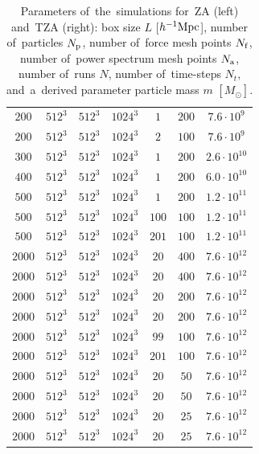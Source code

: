 \begin{landscape}
\begin{table}
{\begin{tabular}{ ccccccc }
    $200$ & $512^3$ & $512^3$ & $1024^3$ & $1$ & $200$ & $7.6\cdot10^{9}$\\
    $200$ & $512^3$ & $512^3$ & $1024^3$ & $2$ & $100$ & $7.6\cdot10^{9}$\\
    $300$ & $512^3$ & $512^3$ & $1024^3$ & $1$ & $200$ & $2.6\cdot10^{10}$\\
    $400$ & $512^3$ & $512^3$ & $1024^3$ & $1$ & $200$ & $6.0\cdot10^{10}$\\
    $500$ & $512^3$ & $512^3$ & $1024^3$ & $1$ & $200$ & $1.2\cdot10^{11}$\\
    $500$ & $512^3$ & $512^3$ & $1024^3$ & $100$ & $100$ & $1.2\cdot10^{11}$\\
    $500$ & $512^3$ & $512^3$ & $1024^3$ & $201$ & $100$ & $1.2\cdot10^{11}$\\
    $2000$ & $512^3$ & $512^3$ & $1024^3$ & $20$ & $400$ & $7.6\cdot10^{12}$\\
    $2000$ & $512^3$ & $512^3$ & $1024^3$ & $20$ & $400$ & $7.6\cdot10^{12}$\\
    $2000$ & $512^3$ & $512^3$ & $1024^3$ & $20$ & $200$ & $7.6\cdot10^{12}$\\
    $2000$ & $512^3$ & $512^3$ & $1024^3$ & $20$ & $200$ & $7.6\cdot10^{12}$\\
    $2000$ & $512^3$ & $512^3$ & $1024^3$ & $99$ & $100$ & $7.6\cdot10^{12}$\\
    $2000$ & $512^3$ & $512^3$ & $1024^3$ & $201$ & $100$ & $7.6\cdot10^{12}$\\
    $2000$ & $512^3$ & $512^3$ & $1024^3$ & $20$ & $50$ & $7.6\cdot10^{12}$\\
    $2000$ & $512^3$ & $512^3$ & $1024^3$ & $20$ & $50$ & $7.6\cdot10^{12}$\\
    $2000$ & $512^3$ & $512^3$ & $1024^3$ & $20$ & $25$ & $7.6\cdot10^{12}$\\
    $2000$ & $512^3$ & $512^3$ & $1024^3$ & $20$ & $25$ & $7.6\cdot10^{12}$\\
    \hline
    \end{tabular}
    }
    \caption{Parameters of~the~simulations for~ZA (left) and~TZA (right): box size $L$ [$h^{-1}\text{Mpc}$], number of~particles $N_{\rm p}$, number of~force mesh points $N_{\rm f}$, number of~power spectrum mesh points $N_{\rm a}$, number of~runs $N$, number of~time-steps $N_t$, and~a~derived parameter particle mass $m$ $[M_\odot]$.}
    \label{tab:sim_param_ZA_TZA}
    \end{table}


\end{landscape}
